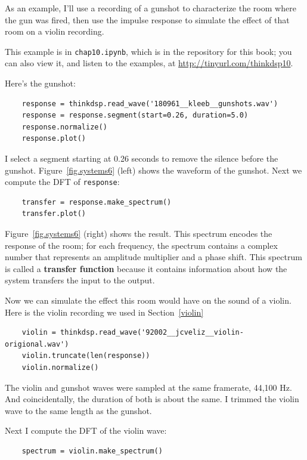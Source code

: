 \documentclass[12pt]{book}
\begin{document}
As an example, I'll use a recording of a gunshot to characterize
the room where the gun was fired, then use the impulse response
to simulate the effect of that room on a violin recording.

This example is in {\tt chap10.ipynb}, which is in the repository
for this book; you can also view it, and listen to the examples,
at \url{http://tinyurl.com/thinkdsp10}.

Here's the gunshot:

\begin{verbatim}
    response = thinkdsp.read_wave('180961__kleeb__gunshots.wav')
    response = response.segment(start=0.26, duration=5.0)
    response.normalize()
    response.plot()
\end{verbatim}

I select a segment starting at 0.26 seconds to remove the silence
before the gunshot.  Figure~\ref{fig.systems6} (left) shows the
waveform of the gunshot.  Next we compute the DFT of {\tt response}:

\begin{verbatim}
    transfer = response.make_spectrum()
    transfer.plot()
\end{verbatim}

Figure~\ref{fig.systems6} (right) shows the result.  This spectrum
encodes the response of the room; for each frequency, the spectrum
contains a complex number that represents an amplitude multiplier and
a phase shift.  This spectrum is called a {\bf transfer
function} because it contains information about how the system transfers
the input to the output.

Now we can simulate the effect this room would have on the sound
of a violin.  Here is the violin recording we used in Section~\ref{violin}

\begin{verbatim}
    violin = thinkdsp.read_wave('92002__jcveliz__violin-origional.wav')
    violin.truncate(len(response))
    violin.normalize()
\end{verbatim}

The violin and gunshot waves were sampled at the same framerate,
44,100 Hz.  And coincidentally, the duration of both is about the
same.  I trimmed the violin wave to the same length as the gunshot.

Next I compute the DFT of the violin wave:

\begin{verbatim}
    spectrum = violin.make_spectrum()
\end{verbatim}
\end{document}
